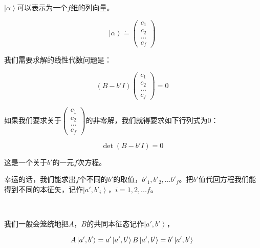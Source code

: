 $\left| \alpha \right\rangle$可以表示为一个$f$维的列向量。

\begin{equation}
\left| \alpha \right\rangle \dot = \left( \begin{array}{ccc} c_1 \\ c_2 \\ ... \\ c_f  \end{array} \right)~
\end{equation}

我们需要求解的线性代数问题是：

\begin{equation}
\left( B - b' I \right) \left( \begin{array}{ccc} c_1 \\ c_2 \\ ... \\ c_f  \end{array} \right)  = 0~
\end{equation}

如果我们要求关于$\left( \begin{array}{ccc} c_1 \\ c_2 \\ ... \\ c_f  \end{array} \right)$的非零解，我们就得要求如下行列式为0：

\begin{equation}
\det \left( B - b' I \right) = 0~
\end{equation}

这是一个关于$b'$的一元$f$次方程。

幸运的话，我们能求出$f$个不同的$b'$的取值，$b'_1, b'_2, ... b'_f$。把$b'$值代回方程我们能得到不同的本征矢，记作$\left| a', b'_i \right\rangle$，$i = 1, 2, ...f$。


~

我们一般会笼统地把$A$，$B$的共同本征态记作$\left| a', b' \right\rangle$，



\begin{equation}
A \left| a', b' \right\rangle = a' \left| a', b' \right\rangle \qquad\\
B \left| a', b' \right\rangle = b' \left| a', b' \right\rangle~
\end{equation}

